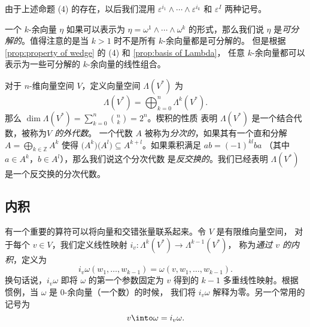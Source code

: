 由于上述命题 (4) 的存在，以后我们混用 $\varepsilon^{i_1} \wedge\cdots\wedge\varepsilon^{i_k}$
和 $\varepsilon^I$ 两种记号。

一个 $k$-余向量 $\eta$ 如果可以表示为 $\eta=\omega^1\wedge\cdots\wedge\omega^k$
的形式，那么我们说 $\eta$ 是\emph{可分解的}。值得注意的是当 $k>1$ 时不是所有 $k$-余向量都是可分解的。
但是根据 \autoref{prop:property of wedge} 的 (4) 和 \autoref{prop:basis of Lambda}，
任意 $k$-余向量都可以表示为一些可分解的 $k$-余向量的线性组合。

对于 $n$-维向量空间 $V$，定义向量空间 $\Lambda(V^*)$ 为
\[
  \Lambda(V^*)=\bigoplus_{k=0}^n\Lambda^k(V^*).  
\]
那么 $\dim\Lambda(V^*)=\sum_{k=0}^n \binom{n}{k}=2^n$。楔积的性质
表明 $\Lambda(V^*)$ 是一个结合代数，被称为\emph{$V$ 的外代数}。
一个代数 $A$ 被称为\emph{分次的}，如果其有一个直和分解 $A=\bigoplus_{k\in \mathbb{Z}}A^k$
使得 $\bigl(A^k\bigr)\bigl(A^l\bigr)\subseteq A^{k+l}$。如果乘积满足
$ab=(-1)^{kl}ba$ （其中 $a\in A^k$，$b\in A^l$），那么我们说这个分次代数
是\emph{反交换的}。我们已经表明 $\Lambda(V^*)$ 是一个反交换的分次代数。

\subsection{内积}

有一个重要的算符可以将向量和交错张量联系起来。令 $V$ 是有限维向量空间，
对于每个 $v\in V$，我们定义线性映射 $i_v:\Lambda^k(V^*)\to\Lambda^{k-1}(V^*)$，
称为\emph{通过 $v$ 的内积}，定义为
\[
  i_v\omega(w_1,\dots,w_{k-1})=\omega(v,w_1,\dots,w_{k-1}).
\]
换句话说，$i_v\omega$ 即将 $\omega$ 的第一个参数固定为 $v$ 得到的
$k-1$ 多重线性映射。根据惯例，当 $\omega$ 是 $0$-余向量（一个数）的时候，
我们将 $i_v\omega$ 解释为零。另一个常用的记号为
\[
  v\into\omega=i_v\omega.  
\]

